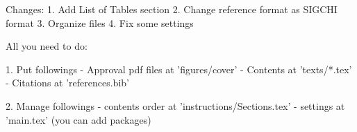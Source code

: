 %
%
%

Changes:
1. Add List of Tables section
2. Change reference format as SIGCHI format
3. Organize files
4. Fix some settings

All you need to do:

1. Put followings
 - Approval pdf files at 'figures/cover'
 - Contents at 'texts/*.tex'
 - Citations at 'references.bib'

2. Manage followings
 - contents order at 'instructions/Sections.tex'
 - settings at 'main.tex' (you can add packages)